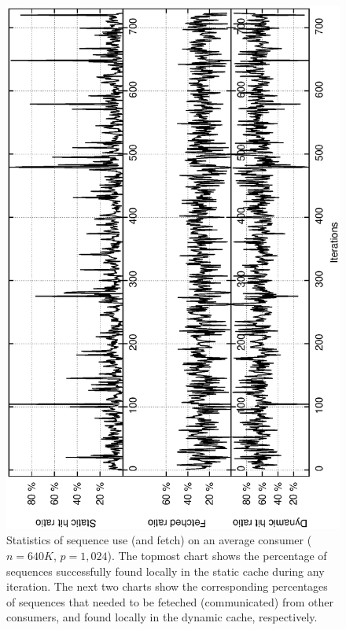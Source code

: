 \documentclass[10pt,journal,letterpaper,compsoc]{IEEEtran}
\begin{document}
\begin{figure}[tb]
\centerline{
						\includegraphics[angle=-90, scale=0.35]{fetch.eps}
            }
\caption{
Statistics of sequence use (and fetch) on an average consumer ($n=640K$, $p=1,024$).
The topmost chart shows the percentage of sequences successfully found locally in the static cache during any iteration. The next two charts show the corresponding percentages of sequences that needed to be feteched (communicated) from other consumers, and found locally in the dynamic cache, respectively.
}

\label{figConsumerFetch}
\end{figure}
\end{document}
